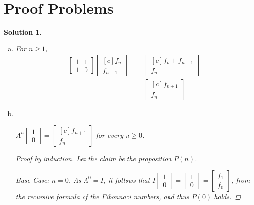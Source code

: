 \documentclass[11pt]{scrartcl}
\theoremstyle{dotlessP}
\newtheorem{sol}{Solution}[section]
\theoremstyle{dotlessN}
\begin{document}
\section{Proof Problems}
\begin{sol}
	\
	\begin{enumerate}[(a)]
		\item For $n \geq 1$,
			\begin{align*}
				\begin{bmatrix}
					1 & 1 \\
					1 & 0
				\end{bmatrix}
				\begin{bmatrix}[c]
					f_n \\
					f_{n-1}
				\end{bmatrix} &= 
				\begin{bmatrix}[c]
					f_n + f_{n-1} \\
					f_n
				\end{bmatrix} \\
				&= 
				\begin{bmatrix}[c]
					f_{n+1}	\\
					f_n
				\end{bmatrix}
			\end{align*}
		\item \
			\begin{claim*}
				$A^n
				\begin{bmatrix}
					1 \\
					0
				\end{bmatrix} = 
				\begin{bmatrix}[c]
					f_{n+1} \\
					f_n
				\end{bmatrix}$ for every $n \geq 0$.
			\end{claim*}
			\begin{proof}
				[Proof by induction]
				Let the claim be the proposition $P(n)$.

				\textit{Base Case:} $n = 0$. As $A^0 = I$, it follows that  $
I
\begin{bmatrix}
	1 \\
	0
\end{bmatrix} = 
\begin{bmatrix}
	1 \\
	0
\end{bmatrix} = 
\begin{bmatrix}
	f_{1} \\
	f_0
\end{bmatrix}
				$, from the recursive formula of the Fibonnaci numbers, and thus $P(0)$ holds.


\end{proof}
\end{enumerate}
\end{sol}
\end{document}
